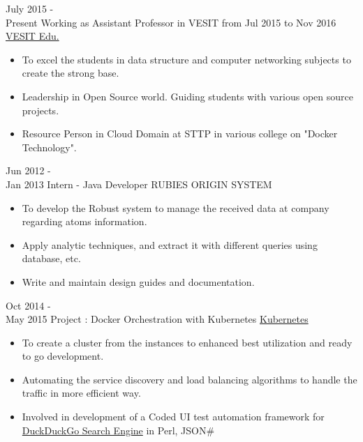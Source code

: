 \documentclass[letterpaper]{twentysecondcv} %
\begin{document}
\begin{twenty} %
	\twentyitem
    	{July 2015 - \\ Present}
        {Working as Assistant Professor in VESIT from Jul 2015 to Nov 2016}
        {\href{http://www.ves.ac.in/}{VESIT Edu.}}
        {}
        {
        {\begin{itemize}
        \item To excel the students in data structure and computer networking subjects to create the strong base.
        \item Leadership in Open Source world. Guiding students with various open source projects.
        \item Resource Person in Cloud Domain at STTP in various college on "Docker Technology". 
    \end{itemize}}
        }
        
    \twentyitem
   		{Jun 2012 - \\ Jan 2013}
        {Intern - Java Developer}
        {RUBIES ORIGIN SYSTEM}
        {}
        {
        {\begin{itemize}
        \item To develop the Robust system to manage the received data at company regarding atoms information.
        \item Apply analytic techniques, and extract it with different queries using database, etc.
        \item Write and maintain design guides and documentation.
    \end{itemize}}
        }
        
     \twentyitem
   		{Oct 2014 - \\ May 2015}
        {Project : Docker Orchestration with Kubernetes}
        {\href{http://kubernetes.io/}{Kubernetes}}
        {}
        {
        \begin{itemize}
        \item To create a cluster from the instances to enhanced best utilization and ready to go development.
        \item Automating the service discovery and load balancing algorithms to handle the traffic in more efficient way.
        \item Involved in development of a Coded UI test automation framework for \href{https://duckduckgo.com/}{DuckDuckGo Search Engine} in Perl, JSON\#
    \end{itemize}
    	}
        
\end{twenty}
\end{document}

